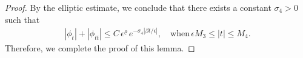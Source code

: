 \documentclass[10pt, reqno]{amsart}
\numberwithin{equation}{section}
\theoremstyle{definition}
\newcommand{\e}{\epsilon}
\begin{document}
{{\begin{proof}
  By the elliptic estimate, we conclude that there exists a constant $\sigma_4>0$ such that
\begin{align*}
 |\phi_t| + |\phi_{tt} |\leq  C \,\epsilon^{\varrho}  \,e^{-\sigma_4 |\beta t/\epsilon| },
 \quad \text{when}\, \e M_3\leq |t|\leq M_4.
\end{align*}
 Therefore, we complete the proof of this lemma.
\end{proof}


}}
\end{document}
